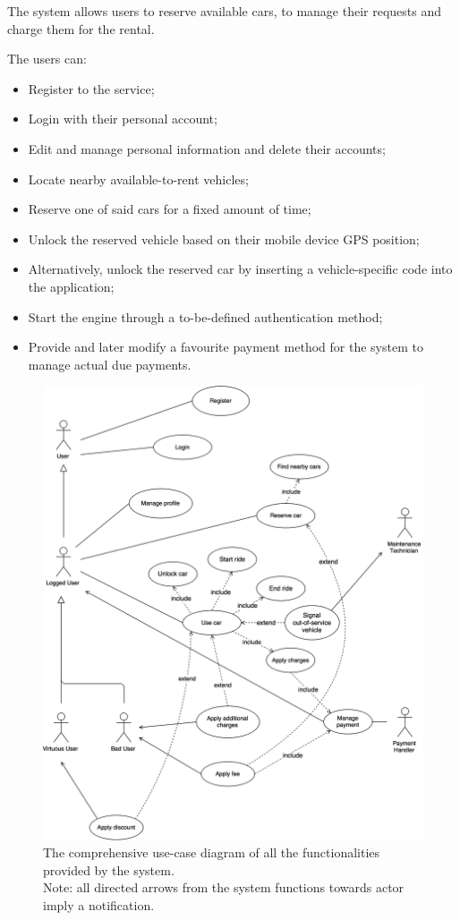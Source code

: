 The system allows users to reserve available cars, to manage their requests and charge them for the rental.

The users can:
\begin{itemize}
\item Register to the service;
\item Login with their personal account;
\item Edit and manage personal information and delete their accounts;
\item Locate nearby available-to-rent vehicles;
\item Reserve one of said cars for a fixed amount of time;
\item Unlock the reserved vehicle based on their mobile device GPS position;
\item Alternatively, unlock the reserved car by inserting a vehicle-specific code into the application;
\item Start the engine through a to-be-defined authentication method;
\item Provide and later modify a favourite payment method for the system to manage actual due payments.
\end{itemize}
\begin{figure}[!h]
	\centering
		\includegraphics[width=\textwidth]{./pictures/use_case.png}
		\caption{The comprehensive use-case diagram of all the functionalities provided by the 						system.\\Note: all directed arrows from the system functions towards actor imply a notification.}
	\label{global_uc}
\end{figure}